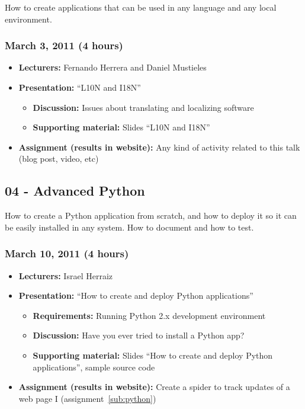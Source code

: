 \documentclass[a4paper]{article}
\begin{document}
How to create applications that can be used in any language and any
local environment.

\subsubsection{March 3, 2011 (4 hours)}

\begin{itemize}
\item \textbf{Lecturers:} Fernando Herrera and Daniel Mustieles
\item \textbf{Presentation:} ``L10N and I18N''
  \begin{itemize}
  \item \textbf{Discussion:} Issues about translating and localizing software
  \item \textbf{Supporting material:} Slides ``L10N and I18N''
  \end{itemize}
\item \textbf{Assignment (results in website):} Any kind of activity
  related to this talk (blog post, video, etc)
\end{itemize}


\subsection{04 - Advanced Python}

How to create a Python application from scratch, and how to deploy it
so it can be easily installed in any system. How to document and how
to test.

\subsubsection{March 10, 2011 (4 hours)}

\begin{itemize}
\item \textbf{Lecturers:} Israel Herraiz
\item \textbf{Presentation:} ``How to create and deploy Python applications''
  \begin{itemize}
\item \textbf{Requirements:} Running Python 2.x development environment
  \item \textbf{Discussion:} Have you ever tried to install a Python app?
  \item \textbf{Supporting material:} Slides ``How to create and
    deploy Python applications'', sample source code
  \end{itemize}
\item \textbf{Assignment (results in website):} Create a spider to
  track updates of a web page I (assignment~\ref{sub:python})
\end{itemize}
\end{document}
